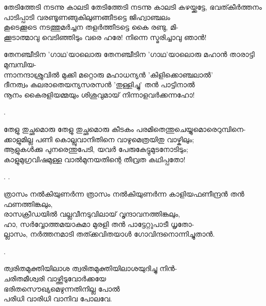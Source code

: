 \begin{enumerate}
\begin{slokam}{\VSv}{\VKG}{തേടിത്തേടി നടന്നു കാലടി}
 തേടിത്തേടി നടന്നു കാലടി കഴയ്ക്കട്ടേ, ഭവത്കീർത്തനം\\
പാടിപ്പാടി വരണ്ടൂണങ്ങുകിലുണങ്ങീടട്ടെ ജിഹ്വാഞ്ചലം\\
കൂടെക്കൂടെ നടത്തുമർച്ചന തളർത്തീടട്ടെ കൈ രണ്ടു, മി-\\
ക്കൂടാത്മാവു വെടിഞ്ഞിടും വരെ ഹരേ! നിന്നെ സ്മരിച്ചാവു ഞാൻ!

\end{slokam}


\begin{slokam}{\VSv}{\KA}{തേനഞ്ചീടിന 'ഗാഥ'യാലൊരു}
 തേനഞ്ചീടിന 'ഗാഥ'യാലൊരു മഹാൻ താരാട്ടി മുമ്പമ്പിയ-\\
ന്നാനന്ദാശ്രുവിൽ മുക്കി മറ്റൊരു മഹാധന്യൻ 'കിളിക്കൊഞ്ചലാൽ'\\
ദീനത്വം കലരാതെയന്യസരസൻ 'തുള്ളിച്ചു' തൻ പാട്ടിനാൽ\\
നൂനം കൈരളിയമ്മയും ശിശുവുമായ്‌ നിന്നാളവർക്കന്നഹോ!

\end{slokam}


.


\begin{slokam}{\VKm}{\KV}{തേളു തുച്ഛമൊരു}
തേളു തുച്ഛമൊരു കീടകം പരമിതെന്തുചെയ്യുമൊരെറുമ്പിനെ-\\
ക്കാളുമില്ല പണി കൊല്ലുവാനിതിനെ വാഴുമെത്രയിതു വാഴ്കിലും;\\
ആളുകള്‍ക്കു പുനരെന്തുപേടി, യവർ പേരുകേട്ടുമുടനോടിടും;\\
കാളുമുഗ്രവിഷമുള്ള വാൽമുനയതിന്റെ തീവ്രത കഥിപ്പതോ!
\end{slokam}


.
.


\begin{slokam}{\VSv}{\VNM}{ത്രാസം നൽകിയുണർന്ന}
ത്രാസം നൽകിയുണർന്ന കാളിയഫണീന്ദ്രൻ തൻ ഫണത്തിങ്കലും,\\
രാസക്രീഡയിൽ വല്ലവീനടുവിലായ്‌ വൃന്ദാവനത്തിങ്കലും,\\
ഹാ, സർവ്വോത്തമയാകുമാ മുരളി തൻ പാട്ടേറ്റുപാടീ ധൃതോ-\\
ല്ലാസം, നർത്തനമാടി തത്ക്കവിതയാള്‍ ഗോവിന്ദനൊന്നിച്ചുതാൻ.
\end{slokam}


.

\begin{slokam}{\VVt}{\AUK}{ത്വരിതമുക്തിയിലാശ}
ത്വരിതമുക്തിയിലാശയുദിച്ചു നിൻ-\\
ചരിതമീശ്വരി വാഴ്ത്തിടുവോർക്കയേ\\
ഭരിതസൌഖ്യമെഴുന്നതിനില്ല പോൽ\\
പരിധി വാരിധി വാനിവ പോലവേ.
\end{slokam}


\end{enumerate}
